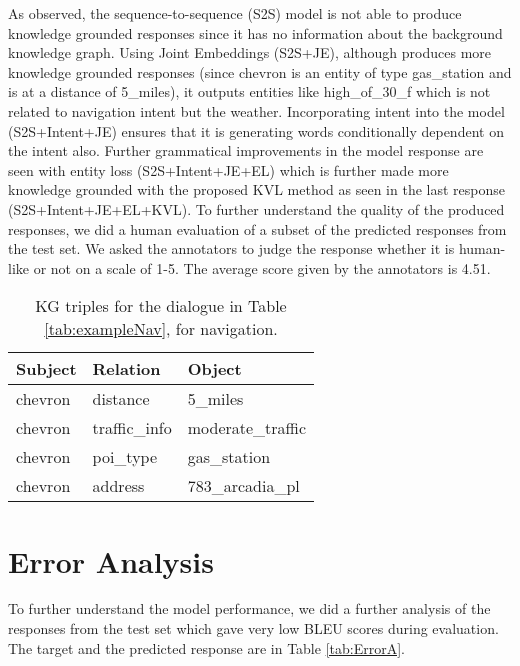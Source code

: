 \documentclass[runningheads]{llncs}
\begin{document}
 As observed, the sequence-to-sequence (S2S) model is not able to produce knowledge grounded responses since it has no information about the background knowledge graph. Using Joint Embeddings (S2S+JE), although produces more knowledge grounded responses (since chevron is an entity of type gas\_station and is at a distance of 5\_miles), it outputs entities like high\_of\_30\_f which is not related to navigation intent but the weather. Incorporating intent into the model (S2S+Intent+JE) ensures that it is generating words conditionally dependent on the intent also. Further grammatical improvements in the model response are seen with entity loss (S2S+Intent+JE+EL) which is further made more knowledge grounded with the proposed KVL method as seen in the last response (S2S+Intent+JE+EL+KVL).
 To further understand the quality of the produced responses, we did a human evaluation of a subset of the predicted responses from the test set. We asked the annotators to judge the response whether it is human-like or not on a scale of 1-5. The average score given by the annotators is 4.51.
 
\begin{table}[ht]
\centering
\small
\caption{KG triples for the dialogue in Table \ref{tab:exampleNav}, for navigation.}
\begin{tabular}{l|l|l}
\hline
    \textbf{Subject}  & \textbf{Relation}  & \textbf{Object}
  \\ \hline
    chevron & distance & 5\_miles \\ 
    chevron & traffic\_info & moderate\_traffic  \\ 
    chevron & poi\_type & gas\_station \\chevron & address & 783\_arcadia\_pl \\

        
    \hline

\end{tabular}
 \vspace{0.1cm}
\label{tab:kb_nav}
\end{table}

\section{Error Analysis}

To further understand the model performance, we did a further analysis of the responses from the test set which gave very low BLEU scores during evaluation. The target and the predicted response are in Table \ref{tab:ErrorA}.
\end{document}
